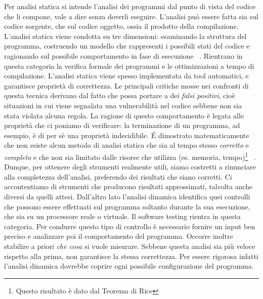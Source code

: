 Per analisi statica si intende l'analisi dei programmi dal punto di vista del codice che li compone, vale a dire senza doverli eseguire. L'analisi può essere fatta sia sul codice sorgente, che sul codice oggetto, ossia  il prodotto della compilazione.\newline
\indent L'analisi statica viene condotta su tre dimensioni: esaminando la struttura del programma, costruendo un modello che rappresenti i possibili stati del codice e ragionando sul possibile comportamento in fase di esecuzione ~\cite{ernst-ijcai97}. 
Rientrano in questa categoria la verifica formale dei programmi e le ottimizzazioni a tempo di compilazione. L'analisi statica viene spesso implementata da tool automatici, e garantisce proprietà di correttezza. Le principali critiche mosse nei confronti di questa tecnica derivano dal fatto che possa portare a dei \textit{falsi positivi}, cioè situazioni in cui viene segnalata una vulnerabilità nel codice sebbene non sia stata violata alcuna regola.
La ragione di questo comportamento è legata alle proprietà che ci poniamo di verificare: la terminazione di un programma, ad esempio, è di per sè una proprietà indecidibile. \'E dimostrato matematicamente che non esiste alcun metodo di analisi statica che sia al tempo stesso \emph{corretto} e \emph{completo} e che non sia limitato dalle risorse che utilizza (es. memoria, tempo)\footnote{Questo risultato è dato dal Teorema di Rice} ~\cite{ausiello2003linguaggi}. Dunque, per ottenere degli strumenti realmente utili, siamo costretti a rinunciare alla completezza dell'analisi, preferendo dei risultati che siano corretti. Ci accontentiamo di strumenti che producono risultati approssimati, talvolta anche diversi da quelli attesi.\newline
\indent Dall'altro lato l'analisi dinamica identifica quei controlli che possono essere effettuati sul programma soltanto durante la sua esecuzione, che sia su un processore reale o virtuale. Il software testing rientra in questa categoria. Per condurre questo tipo di controllo è necessario fornire un input ben preciso e analizzare poi il comportamento del programma. Occorre inoltre stabilire a priori \emph{che cosa} si vuole misurare. Sebbene questa analisi sia più veloce rispetto alla prima, non garantisce la stessa correttezza. Per essere rigorosa infatti l'analisi dinamica dovrebbe coprire ogni possibile configurazione del programma.\\


